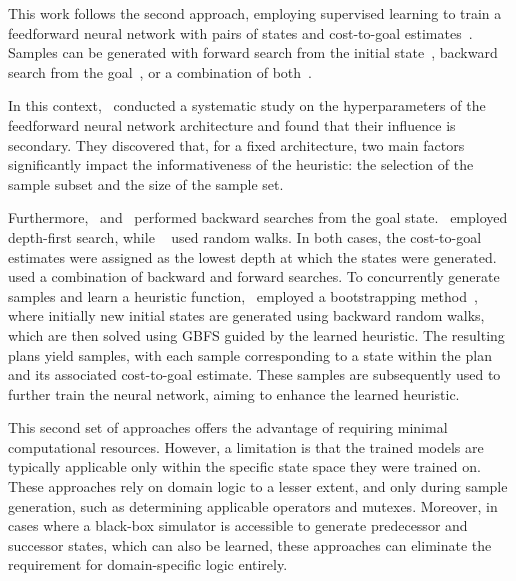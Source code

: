 \documentclass[ppgc,diss,english]{iiufrgs}
\begin{document}
This work follows the second approach, employing supervised learning to train a feedforward neural network with pairs of states and cost-to-goal estimates~\cite{Ferber.etal/2020a,Yu.etal/2020,Ferber.etal/2022,OToole/2022}. Samples can be generated with forward search from the initial state~\cite{Ferber.etal/2020a}, backward search from the goal~\cite{Yu.etal/2020,OToole/2022}, or a combination of both~\cite{Ferber.etal/2022}.

In this context,~\citet{Ferber.etal/2020a} conducted a systematic study on the hyperparameters of the feedforward neural network architecture and found that their influence is secondary. They discovered that, for a fixed architecture, two main factors significantly impact the informativeness of the heuristic: the selection of the sample subset and the size of the sample set.

Furthermore,~\citet{Yu.etal/2020} and~\citet{OToole/2022} performed backward searches from the goal state.~\citet{Yu.etal/2020} employed depth-first search, while ~\citet{OToole/2022} used random walks. In both cases, the cost-to-goal estimates were assigned as the lowest depth at which the states were generated.~\citet{Ferber.etal/2022} used a combination of backward and forward searches. To concurrently generate samples and learn a heuristic function,~\citet{Ferber.etal/2022} employed a bootstrapping method~\cite{Arfaee.etal/2011}, where initially new initial states are generated using backward random walks, which are then solved using GBFS guided by the learned heuristic. The resulting plans yield samples, with each sample corresponding to a state within the plan and its associated cost-to-goal estimate. These samples are subsequently used to further train the neural network, aiming to enhance the learned heuristic.

This second set of approaches offers the advantage of requiring minimal computational resources. However, a limitation is that the trained models are typically applicable only within the specific state space they were trained on. These approaches rely on domain logic to a lesser extent, and only during sample generation, such as determining applicable operators and mutexes. Moreover, in cases where a black-box simulator is accessible to generate predecessor and successor states, which can also be learned, these approaches can eliminate the requirement for domain-specific logic entirely.
\end{document}
